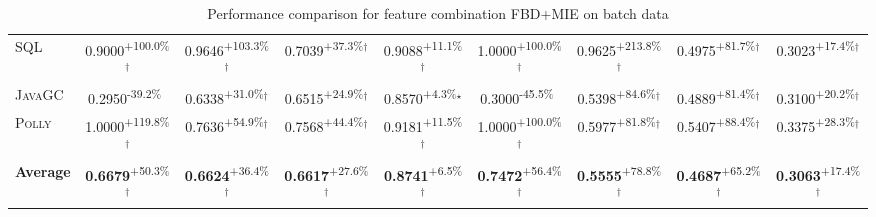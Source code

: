 \begin{table}[htbp]
\begin{tabular}{l|cccc|cccc}
\textsc{SQL} & \cellcolor{green!30}0.9000\textsuperscript{+100.0\%}$^\dagger$ & \cellcolor{green!30}0.9646\textsuperscript{+103.3\%}$^\dagger$ & \cellcolor{green!30}0.7039\textsuperscript{+37.3\%}$^\dagger$ & \cellcolor{green!30}0.9088\textsuperscript{+11.1\%}$^\dagger$ & \cellcolor{green!30}1.0000\textsuperscript{+100.0\%}$^\dagger$ & \cellcolor{green!30}0.9625\textsuperscript{+213.8\%}$^\dagger$ & \cellcolor{green!30}0.4975\textsuperscript{+81.7\%}$^\dagger$ & \cellcolor{green!30}0.3023\textsuperscript{+17.4\%}$^\dagger$ \\
\textsc{JavaGC} & \cellcolor{red!30}0.2950\textsuperscript{-39.2\%}$^{\,\,\,}$ & \cellcolor{green!30}0.6338\textsuperscript{+31.0\%}$^\dagger$ & \cellcolor{green!30}0.6515\textsuperscript{+24.9\%}$^\dagger$ & \cellcolor{green!30}0.8570\textsuperscript{+4.3\%}$^\star$ & \cellcolor{red!30}0.3000\textsuperscript{-45.5\%}$^{\,\,\,}$ & \cellcolor{green!30}0.5398\textsuperscript{+84.6\%}$^\dagger$ & \cellcolor{green!30}0.4889\textsuperscript{+81.4\%}$^\dagger$ & \cellcolor{green!30}0.3100\textsuperscript{+20.2\%}$^\dagger$ \\
\textsc{Polly} & \cellcolor{green!30}1.0000\textsuperscript{+119.8\%}$^\dagger$ & \cellcolor{green!30}0.7636\textsuperscript{+54.9\%}$^\dagger$ & \cellcolor{green!30}0.7568\textsuperscript{+44.4\%}$^\dagger$ & \cellcolor{green!30}0.9181\textsuperscript{+11.5\%}$^\dagger$ & \cellcolor{green!30}1.0000\textsuperscript{+100.0\%}$^\dagger$ & \cellcolor{green!30}0.5977\textsuperscript{+81.8\%}$^\dagger$ & \cellcolor{green!30}0.5407\textsuperscript{+88.4\%}$^\dagger$ & \cellcolor{green!30}0.3375\textsuperscript{+28.3\%}$^\dagger$ \\
\hline
\textbf{Average} & \cellcolor{green!30}\textbf{0.6679}\textsuperscript{+50.3\%}$^\dagger$ & \cellcolor{green!30}\textbf{0.6624}\textsuperscript{+36.4\%}$^\dagger$ & \cellcolor{green!30}\textbf{0.6617}\textsuperscript{+27.6\%}$^\dagger$ & \cellcolor{green!30}\textbf{0.8741}\textsuperscript{+6.5\%}$^\dagger$ & \cellcolor{green!30}\textbf{0.7472}\textsuperscript{+56.4\%}$^\dagger$ & \cellcolor{green!30}\textbf{0.5555}\textsuperscript{+78.8\%}$^\dagger$ & \cellcolor{green!30}\textbf{0.4687}\textsuperscript{+65.2\%}$^\dagger$ & \cellcolor{green!30}\textbf{0.3063}\textsuperscript{+17.4\%}$^\dagger$ \\
\hline
\end{tabular}
\caption{Performance comparison for feature combination FBD+MIE on batch data}
\label{tab:combo_FBD_MIE_performance_batch}
\end{table}